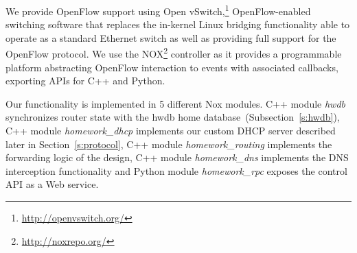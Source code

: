 % 

We provide OpenFlow support using Open
vSwitch,\footnote{\url{http://openvswitch.org/}} OpenFlow-enabled switching
software that replaces the in-kernel Linux bridging functionality able to
operate as a standard Ethernet switch as well as providing full support for the
OpenFlow protocol.  We use the NOX\footnote{\url{http://noxrepo.org/}}
controller as it provides a programmable platform abstracting OpenFlow
interaction to events with associated callbacks, exporting APIs for C++ and
Python.

Our functionality is implemented in 5 different Nox modules.  C++ module {\it
  hwdb} synchronizes router state with the hwdb home
database~(Subsection~\ref{s:hwdb}), C++ module {\it
  homework\_dhcp} implements our custom DHCP server described later in
Section~\ref{s:protocol}, C++ module {\it homework\_routing} implements the
forwarding logic of the design, C++ module {\it homework\_dns} implements the DNS
interception functionality and Python module {\it homework\_rpc} exposes the
control API as a Web service. 



